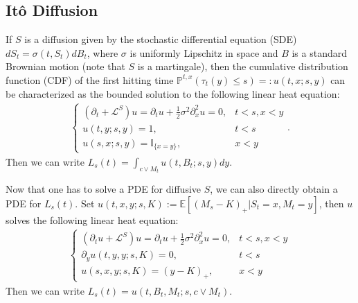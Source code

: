\documentclass[openany,oneside]{article}
\theoremstyle{definition}
\theoremstyle{remark}
\newcommand{\E}{\mathbb{E}} %
\renewcommand{\P}{\mathbb{P}} %
\newcommand{\I}{\mathbb{I}} %
\begin{document}
\subsection{It\^o Diffusion}
If $S$ is a diffusion given by the stochastic differential equation (SDE) $dS_t = \sigma(t,S_t) dB_t$, where $\sigma$ is uniformly Lipschitz in space and $B$ is a standard Brownian motion (note that $S$ is a martingale), then the cumulative distribution function (CDF) of the first hitting time $\P^{t,x}(\tau_t(y)\le s)=:u(t,x;s,y)$ can be characterized as the bounded solution to the following linear heat equation:
\begin{align*}
\begin{cases}
(\partial_t + \mathcal{L}^S)u = \partial_t u + \frac{1}{2}\sigma^2\partial^2_x u = 0, & t<s, x<y \\
u(t,y;s,y)=1, & t<s \\
u(s,x;s,y)=\I_{\{x=y\}}, & x<y
\end{cases}.
\end{align*}
Then we can write $L_s(t) = \int_{c\vee M_t} u(t,B_t;s,y) dy$.

Now that one has to solve a PDE for diffusive $S$, we can also directly obtain a PDE for $L_s(t)$. Set $u(t,x,y;s,K):=\E\left[(M_s-K)_+ \vert S_t=x, M_t=y\right]$, then $u$ solves the following linear heat equation:
\begin{align*}
\begin{cases}
(\partial_t u + \mathcal{L}^S)u = \partial_t u + \frac{1}{2}\sigma^2\partial^2_x u = 0, & t<s, x<y \\
\partial_y u(t,y,y;s,K) = 0, & t<s \\
u(s,x,y;s,K) = (y-K)_+, & x<y
\end{cases}
\end{align*}
Then we can write $L_s(t) = u(t,B_t,M_t;s,c\vee M_t)$.
\end{document}
